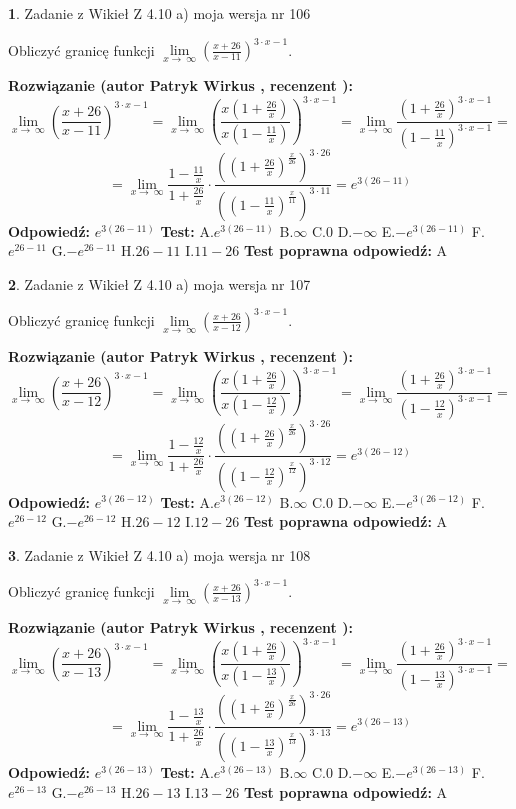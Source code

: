\documentclass[12pt, a4paper]{article}
\theoremstyle{definition} %
\newtheorem{zad}{}
\newcommand{\zadStart}[1]{\begin{zad}#1\newline}
\newcommand{\zadStop}{\end{zad}}
\newcommand{\rozwStart}[2]{\noindent \textbf{Rozwiązanie (autor #1 , recenzent #2): }\newline}
\newcommand{\rozwStop}{\newline}
\newcommand{\odpStart}{\noindent \textbf{Odpowiedź:}\newline}
\newcommand{\odpStop}{\newline}
\newcommand{\testStart}{\noindent \textbf{Test:}\newline}
\newcommand{\testStop}{\newline}
\newcommand{\kluczStart}{\noindent \textbf{Test poprawna odpowiedź:}\newline}
\newcommand{\kluczStop}{\newline}
\begin{document}
\zadStart{Zadanie z Wikieł Z 4.10 a) moja wersja nr 106}


Obliczyć granicę funkcji  $\lim\limits_{x\to\ \infty}(\frac{x+26}{x-11})^{3\cdot x-1}$.
\zadStop
\rozwStart{Patryk Wirkus}{}
$$\lim\limits_{x\to\ \infty}(\frac{x+26}{x-11})^{3\cdot x-1} = \lim\limits_{x\to\ \infty}(\frac{x(1+\frac{26}{x})}{x(1-\frac{11}{x})})^{3\cdot x-1}=\lim\limits_{x\to\ \infty}\frac{(1+\frac{26}{x})^{3\cdot x-1}}{(1-\frac{11}{x})^{3\cdot x-1}}=$$
$$=\lim\limits_{x\to\ \infty}\frac{1-\frac{11}{x}}{1+\frac{26}{x}}\cdot\frac{((1+\frac{26}{x})^{\frac{x}{26}})^{3\cdot26}}{((1-\frac{11}{x})^{\frac{x}{11}})^{3\cdot11}}=e^{3(26-11)}$$
\rozwStop
\odpStart
$e^{3(26-11)}$
\odpStop
\testStart
A.$e^{3(26-11)}$ B.$\infty$ C.$0$ D.$-\infty$ E.$-e^{3(26-11)}$
F.$e^{26-11}$ G.$-e^{26-11}$
H.$26-11$
I.$11-26$
\testStop
\kluczStart
A
\kluczStop



\zadStart{Zadanie z Wikieł Z 4.10 a) moja wersja nr 107}


Obliczyć granicę funkcji  $\lim\limits_{x\to\ \infty}(\frac{x+26}{x-12})^{3\cdot x-1}$.
\zadStop
\rozwStart{Patryk Wirkus}{}
$$\lim\limits_{x\to\ \infty}(\frac{x+26}{x-12})^{3\cdot x-1} = \lim\limits_{x\to\ \infty}(\frac{x(1+\frac{26}{x})}{x(1-\frac{12}{x})})^{3\cdot x-1}=\lim\limits_{x\to\ \infty}\frac{(1+\frac{26}{x})^{3\cdot x-1}}{(1-\frac{12}{x})^{3\cdot x-1}}=$$
$$=\lim\limits_{x\to\ \infty}\frac{1-\frac{12}{x}}{1+\frac{26}{x}}\cdot\frac{((1+\frac{26}{x})^{\frac{x}{26}})^{3\cdot26}}{((1-\frac{12}{x})^{\frac{x}{12}})^{3\cdot12}}=e^{3(26-12)}$$
\rozwStop
\odpStart
$e^{3(26-12)}$
\odpStop
\testStart
A.$e^{3(26-12)}$ B.$\infty$ C.$0$ D.$-\infty$ E.$-e^{3(26-12)}$
F.$e^{26-12}$ G.$-e^{26-12}$
H.$26-12$
I.$12-26$
\testStop
\kluczStart
A
\kluczStop



\zadStart{Zadanie z Wikieł Z 4.10 a) moja wersja nr 108}


Obliczyć granicę funkcji  $\lim\limits_{x\to\ \infty}(\frac{x+26}{x-13})^{3\cdot x-1}$.
\zadStop
\rozwStart{Patryk Wirkus}{}
$$\lim\limits_{x\to\ \infty}(\frac{x+26}{x-13})^{3\cdot x-1} = \lim\limits_{x\to\ \infty}(\frac{x(1+\frac{26}{x})}{x(1-\frac{13}{x})})^{3\cdot x-1}=\lim\limits_{x\to\ \infty}\frac{(1+\frac{26}{x})^{3\cdot x-1}}{(1-\frac{13}{x})^{3\cdot x-1}}=$$
$$=\lim\limits_{x\to\ \infty}\frac{1-\frac{13}{x}}{1+\frac{26}{x}}\cdot\frac{((1+\frac{26}{x})^{\frac{x}{26}})^{3\cdot26}}{((1-\frac{13}{x})^{\frac{x}{13}})^{3\cdot13}}=e^{3(26-13)}$$
\rozwStop
\odpStart
$e^{3(26-13)}$
\odpStop
\testStart
A.$e^{3(26-13)}$ B.$\infty$ C.$0$ D.$-\infty$ E.$-e^{3(26-13)}$
F.$e^{26-13}$ G.$-e^{26-13}$
H.$26-13$
I.$13-26$
\testStop
\kluczStart
A
\kluczStop
\end{document}

